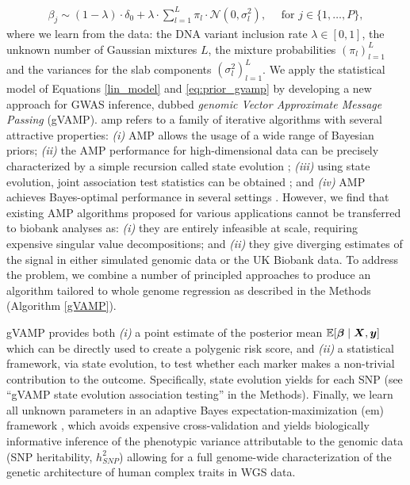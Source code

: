 \begin{align}\label{eq:prior_gvamp}
    \beta_j \sim (1-\lambda) \cdot \delta_0 + \lambda \cdot \sum^{L}_{l=1} \pi_l \cdot \mathcal{N}(0, \sigma_l^2),\quad  \text{ for } j\in \{1, \ldots, P\},
\end{align}
where we learn from the data: the DNA variant inclusion rate $\lambda \in [0,1]$,  the unknown number of Gaussian mixtures $L$,  the mixture probabilities $(\pi_{l})^{L}_{l=1}$ and the variances for the slab components $(\sigma_{l}^{2})^{L}_{l=1}$. 
We apply the statistical model of Equations \eqref{lin_model} and \eqref{eq:prior_gvamp} by developing a new approach for GWAS inference, dubbed \textit{genomic Vector Approximate Message Passing} (gVAMP). \acrfull{amp} \cite{DMM09,rangan_vector_2019,feng2022unifying} refers to a family of iterative algorithms with several attractive properties: \emph{(i)} AMP allows the usage of a wide range of Bayesian priors; \emph{(ii)} the AMP performance for high-dimensional data can be precisely characterized by a simple recursion called state evolution \cite{Bayati2011}; \emph{(iii)} using state evolution, joint association test statistics can be obtained \cite{montanari2017estimation}; and \emph{(iv)} AMP achieves Bayes-optimal performance in several settings \cite{barbier-mmse-glm-pnas,montanari2017estimation,barbier2023fundamental}. However, we find that existing AMP algorithms proposed for various applications \cite{jeon, metzler2016,eksioglu,zhong2021empirical} cannot be transferred to biobank analyses as: \emph{(i)} they are entirely infeasible at scale, requiring expensive singular value decompositions; and \emph{(ii)} they give diverging estimates of the signal in either simulated genomic data or the UK Biobank data. To address the problem, we combine a number of principled approaches to produce an algorithm tailored to whole genome regression as described in the Methods (Algorithm \ref{gVAMP}). 

gVAMP provides both \emph{(i)} a point estimate of the posterior mean $\mathbb E[\bm{\beta}\mid {\boldsymbol X}, \bm{y}]$ which can be directly used to create a polygenic risk score, and \emph{(ii)} a statistical framework, via state evolution, to test whether each marker makes a non-trivial contribution to the outcome. Specifically, state evolution yields  for each SNP (see ``gVAMP state evolution association testing'' in the Methods). Finally, we learn all unknown parameters in an adaptive Bayes expectation-maximization (\gls{em}) framework \cite{LearningFreeEnergies2018,RigorousDynamics2017}, which avoids expensive cross-validation and yields biologically informative inference of the phenotypic variance attributable to the genomic data (SNP heritability, $h^{2}_{SNP}$) allowing for a full genome-wide characterization of the genetic architecture of human complex traits in WGS data.


